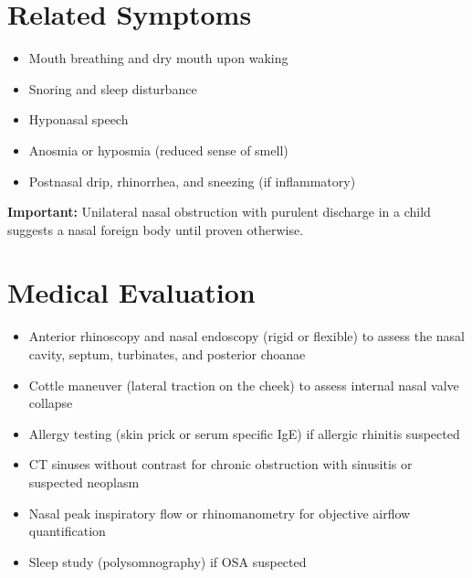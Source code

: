 \section*{Related Symptoms}
\begin{itemize}
  \item Mouth breathing and dry mouth upon waking
  \item Snoring and sleep disturbance
  \item Hyponasal speech
  \item Anosmia or hyposmia (reduced sense of smell)
  \item Postnasal drip, rhinorrhea, and sneezing (if inflammatory)
\end{itemize}
\textbf{Important:} Unilateral nasal obstruction with purulent discharge in a child suggests a nasal foreign body until proven otherwise.

\section*{Medical Evaluation}
\begin{itemize}
  \item Anterior rhinoscopy and nasal endoscopy (rigid or flexible) to assess the nasal cavity, septum, turbinates, and posterior choanae
  \item Cottle maneuver (lateral traction on the cheek) to assess internal nasal valve collapse
  \item Allergy testing (skin prick or serum specific IgE) if allergic rhinitis suspected
  \item CT sinuses without contrast for chronic obstruction with sinusitis or suspected neoplasm
  \item Nasal peak inspiratory flow or rhinomanometry for objective airflow quantification
  \item Sleep study (polysomnography) if OSA suspected
\end{itemize}

